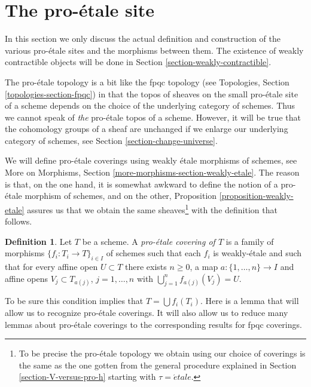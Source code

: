 \documentclass{stacks-project}
\theoremstyle{plain}
\theoremstyle{definition}
\newtheorem{definition}[subsection]{Definition}
\theoremstyle{remark}
\numberwithin{equation}{subsection}
\def\etale{{\acute{e}tale}}
\begin{document}
\section{The pro-\'etale site}
\label{section-proetale}

\noindent
In this section we only discuss the actual definition and construction
of the various pro-\'etale sites and the morphisms between them. The
existence of weakly contractible objects will be done in
Section \ref{section-weakly-contractible}.

\medskip\noindent
The pro-\'etale topology is a bit like
the fpqc topology (see Topologies, Section \ref{topologies-section-fpqc})
in that the topos of sheaves on the small pro-\'etale site of a scheme
depends on the choice of the underlying category of schemes. Thus we cannot
speak of {\it the} pro-\'etale topos of a scheme. However, it will be
true that the cohomology groups of a sheaf are unchanged if we enlarge
our underlying category of schemes, see Section \ref{section-change-universe}.

\medskip\noindent
We will define pro-\'etale coverings using weakly \'etale morphisms of schemes,
see More on Morphisms, Section \ref{more-morphisms-section-weakly-etale}.
The reason is that, on the one hand, it is somewhat awkward to define
the notion of a pro-\'etale morphism of schemes, and on the other,
Proposition \ref{proposition-weakly-etale}
assures us that we obtain the same sheaves\footnote{To be precise
the pro-\'etale topology we obtain using our choice of coverings
is the same as the one gotten from the general procedure explained
in Section \ref{section-V-versus-pro-h} starting with $\tau = \etale$.}
with the definition that follows.

\begin{definition}
\label{definition-fpqc-covering}
Let $T$ be a scheme. A {\it pro-\'etale covering of $T$} is a family
of morphisms $\{f_i : T_i \to T\}_{i \in I}$ of schemes
such that each $f_i$ is weakly-\'etale and such that for every affine open
$U \subset T$ there exists $n \geq 0$, a map
$a : \{1, \ldots, n\} \to I$ and affine opens
$V_j \subset T_{a(j)}$, $j = 1, \ldots, n$
with $\bigcup_{j = 1}^n f_{a(j)}(V_j) = U$.
\end{definition}

\noindent
To be sure this condition implies that $T = \bigcup f_i(T_i)$.
Here is a lemma that will allow us to recognize pro-\'etale coverings.
It will also allow us to reduce many lemmas about pro-\'etale coverings
to the corresponding results for fpqc coverings.
\end{document}
